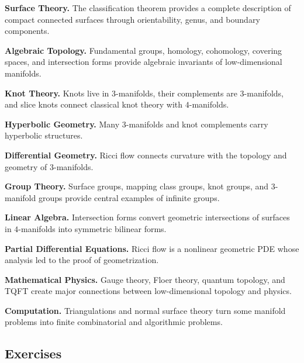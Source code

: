 \begin{applicationbox}
\textbf{Surface Theory.}
The classification theorem provides a complete description of compact
connected surfaces through orientability, genus, and boundary components.

\medskip

\textbf{Algebraic Topology.}
Fundamental groups, homology, cohomology, covering spaces, and intersection
forms provide algebraic invariants of low-dimensional manifolds.

\medskip

\textbf{Knot Theory.}
Knots live in \(3\)-manifolds, their complements are \(3\)-manifolds, and
slice knots connect classical knot theory with \(4\)-manifolds.

\medskip

\textbf{Hyperbolic Geometry.}
Many \(3\)-manifolds and knot complements carry hyperbolic structures.

\medskip

\textbf{Differential Geometry.}
Ricci flow connects curvature with the topology and geometry of
\(3\)-manifolds.

\medskip

\textbf{Group Theory.}
Surface groups, mapping class groups, knot groups, and \(3\)-manifold groups
provide central examples of infinite groups.

\medskip

\textbf{Linear Algebra.}
Intersection forms convert geometric intersections of surfaces in
\(4\)-manifolds into symmetric bilinear forms.

\medskip

\textbf{Partial Differential Equations.}
Ricci flow is a nonlinear geometric PDE whose analysis led to the proof of
geometrization.

\medskip

\textbf{Mathematical Physics.}
Gauge theory, Floer theory, quantum topology, and TQFT create major
connections between low-dimensional topology and physics.

\medskip

\textbf{Computation.}
Triangulations and normal surface theory turn some manifold problems into
finite combinatorial and algorithmic problems.
\end{applicationbox}

\subsection{Exercises}
\label{subsec:low-dimensional-exercises}

